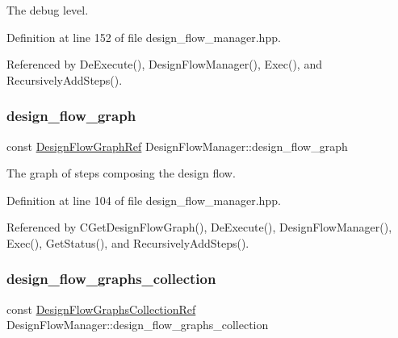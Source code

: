 The debug level. 



Definition at line 152 of file design\+\_\+flow\+\_\+manager.\+hpp.



Referenced by De\+Execute(), Design\+Flow\+Manager(), Exec(), and Recursively\+Add\+Steps().

\mbox{\label{classDesignFlowManager_a2ecadf8326eac0ac1418595f1c312af2}} 
\subsubsection{\texorpdfstring{design\+\_\+flow\+\_\+graph}{design\_flow\_graph}}
{\footnotesize\ttfamily const \hyperlink{design__flow__graph_8hpp_ab67393ecbbac075afaded9713a6cb39a}{Design\+Flow\+Graph\+Ref} Design\+Flow\+Manager\+::design\+\_\+flow\+\_\+graph\hspace{0.3cm}{\ttfamily [private]}}



The graph of steps composing the design flow. 



Definition at line 104 of file design\+\_\+flow\+\_\+manager.\+hpp.



Referenced by C\+Get\+Design\+Flow\+Graph(), De\+Execute(), Design\+Flow\+Manager(), Exec(), Get\+Status(), and Recursively\+Add\+Steps().

\mbox{\label{classDesignFlowManager_af7a54cf43b76cd8da9a64e7e83fb93bd}} 
\subsubsection{\texorpdfstring{design\+\_\+flow\+\_\+graphs\+\_\+collection}{design\_flow\_graphs\_collection}}
{\footnotesize\ttfamily const \hyperlink{design__flow__graph_8hpp_abb8645fa685dc5bd944be20162a6d174}{Design\+Flow\+Graphs\+Collection\+Ref} Design\+Flow\+Manager\+::design\+\_\+flow\+\_\+graphs\+\_\+collection\hspace{0.3cm}{\ttfamily [private]}}



